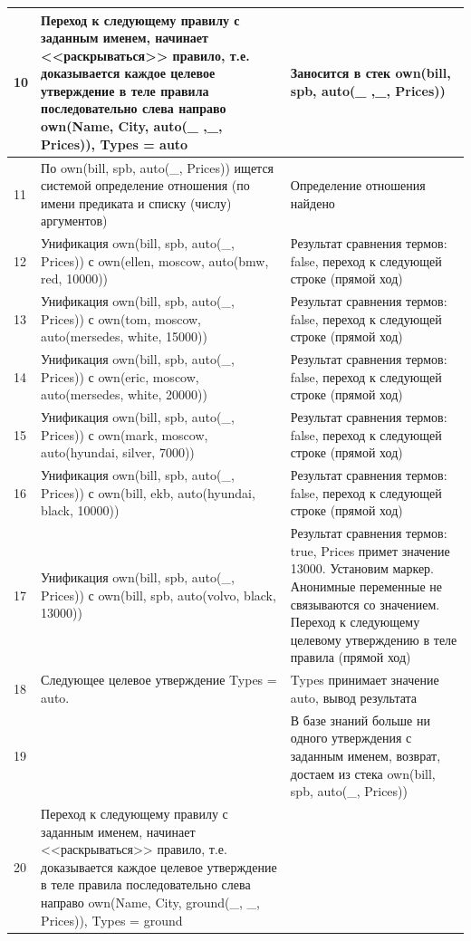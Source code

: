 \documentclass[a4paper,14pt]{extreport} %
\begin{document}
\begin{longtable}{|p{1.1cm}|p{8.5cm}|p{7cm}|}
	10 & Переход к следующему правилу с заданным именем, начинает <<раскрываться>> правило, т.е. доказывается каждое целевое утверждение в теле правила последовательно слева направо
	own(Name, City, auto(\_ ,\_, Prices)), Types = auto
	
	& Заносится в стек own(bill, spb, auto(\_ ,\_, Prices))\\ \hline

	11 & По own(bill, spb, auto(\_, Prices))  ищется системой определение отношения (по имени предиката и списку (числу) аргументов) & Определение отношения найдено \\ \hline
	12 & Унификация own(bill, spb, auto(\_, Prices)) с own(ellen, moscow, auto(bmw, red, 10000)) & Результат сравнения термов: false, переход к следующей строке (прямой ход) \\ \hline
	13 & Унификация own(bill, spb, auto(\_, Prices)) с own(tom, moscow, auto(mersedes, white, 15000)) & Результат сравнения термов: false, переход к следующей строке (прямой ход) \\ \hline
	14 & Унификация own(bill, spb, auto(\_, Prices)) с own(eric, moscow, auto(mersedes, white, 20000)) & Результат сравнения термов: false, переход к следующей строке (прямой ход) \\ \hline
	15 & Унификация own(bill, spb, auto(\_, Prices)) с own(mark, moscow, auto(hyundai, silver, 7000)) & Результат сравнения термов: false, переход к следующей строке (прямой ход) \\ \hline
	16 & Унификация own(bill, spb, auto(\_, Prices)) с own(bill, ekb, auto(hyundai, black, 10000)) & Результат сравнения термов: false, переход к следующей строке (прямой ход) \\ \hline
	17 & Унификация own(bill, spb, auto(\_, Prices)) с own(bill, spb, auto(volvo, black, 13000)) & Результат сравнения термов: true, Prices примет значение 13000. Установим маркер. Анонимные переменные не связываются со значением. Переход к следующему целевому утверждению в теле правила (прямой ход) \\ \hline
	18 & Следующее целевое утверждение Types = auto.  & Types принимает значение auto, вывод результата \\ \hline
	19 &  &  В базе знаний больше ни одного утверждения с заданным именем, возврат, достаем из стека own(bill, spb, auto(\_, Prices)) \\ \hline
	
	20 & Переход к следующему правилу с заданным именем, начинает <<раскрываться>> правило, т.е. доказывается каждое целевое утверждение в теле правила последовательно слева направо
	own(Name, City, ground(\_, \_, Prices)), Types = ground
	

\end{longtable}
\end{document}
